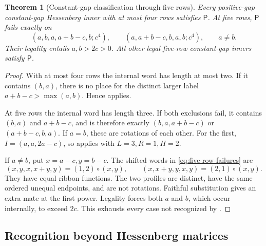 \documentclass[11pt,a4paper]{amsart}
\numberwithin{equation}{section}
\theoremstyle{plain}
\newtheorem{theorem}{Theorem}[section]
\theoremstyle{definition}
\begin{document}
\begin{theorem}[Constant-gap classification through five rows]\label{thm:five-row-classification}
Every positive-gap constant-gap Hessenberg inner with at most four rows satisfies \(\mathsf P\).  At five rows, \(\mathsf P\) fails exactly on
\begin{equation}\label{eq:five-row-failures}
 (a,b,a,a+b-c,b;c^4),\qquad
 (a,a+b-c,b,a,b;c^4),\qquad a\ne b.
\end{equation}
Their legality entails \(a,b>2c>0\).  All other legal five-row constant-gap inners satisfy \(\mathsf P\).
\end{theorem}
\begin{proof}
With at most four rows the internal word has length at most two.  If it contains \((b,a)\), there is no place for the distinct larger label \(a+b-c>\max(a,b)\).  Hence  applies.

At five rows the internal word has length three.  If both exclusions fail, it contains \((b,a)\) and \(a+b-c\), and is therefore exactly \((b,a,a+b-c)\) or \((a+b-c,b,a)\).  If \(a=b\), these are rotations of each other.  For the first, \(I=(a,a,2a-c)\), so  applies with \(L=3,R=1,H=2\).

If \(a\ne b\), put \(x=a-c,y=b-c\).  The shifted words in \eqref{eq:five-row-failures} are
\[
 (x,y,x,x+y,y)=(1,2)\circ(x,y),\qquad
 (x,x+y,y,x,y)=(2,1)\circ(x,y).
\]
They have equal ribbon functions.  The two profiles are distinct, have the same ordered unequal endpoints, and are not rotations.  Faithful substitution gives an extra mate at the first power.  Legality forces both \(a\) and \(b\), which occur internally, to exceed \(2c\).  This exhausts every case not recognized by .
\end{proof}

\subsection{Recognition beyond Hessenberg matrices}
\end{document}
